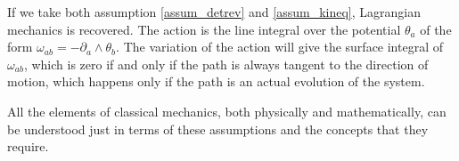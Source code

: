 If we take both assumption \ref{assum_detrev} and \ref{assum_kineq}, Lagrangian mechanics is recovered. The action is the line integral over the potential $\theta_a$ of the form $\omega_{ab} = - \partial_a \wedge \theta_b$. The variation of the action will give the surface integral of $\omega_{ab}$, which is zero if and only if the path is always tangent to the direction of motion, which happens only if the path is an actual evolution of the system.

All the elements of classical mechanics, both physically and mathematically, can be understood just in terms of these assumptions and the concepts that they require.
